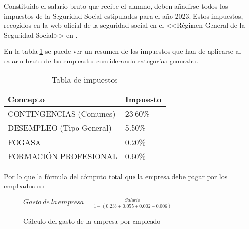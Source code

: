 Constituido el salario bruto que recibe el alumno, deben añadirse todos los
impuestos de la Seguridad Social estipulados para el año 2023. Estos impuestos,
recogidos en la web oficial de la seguridad social en el <<Régimen General de la
Seguridad Social>> en \cite{cotizacion2023}.

En la tabla \ref{tabla:seg-social} se puede ver un resumen de los impuestos que
han de aplicarse al salario bruto de los empleados considerando categorías
generales.

\begin{table}[H]
    \centering
    \begin{tabular}{ll}
        \toprule
    \textbf{Concepto}  & \textbf{Impuesto} \\ \midrule
    CONTINGENCIAS   (Comunes)  & 23.60\% \\
    DESEMPLEO  (Tipo General) & 5.50\%  \\
    FOGASA                   & 0.20\%  \\
    FORMACIÓN PROFESIONAL      & 0.60\% 
    \end{tabular}%
    \caption{Tabla de impuestos}
    \label{tabla:seg-social}
\end{table}

Por lo que la fórmula del cómputo total que la empresa debe pagar por los
empleados es:

\begin{figure}[H]
\begin{center}
    $Gasto~de~la~empresa = \frac{Salario}{1-(0.236+0.055+0.002+0.006)}$
\end{center}
\caption{Cálculo del gasto de la empresa por empleado}
\end{figure}


\begin{table}[H]
\caption{Salarios brutos y coste que supone a la empresa}
\label{tabla:salarios}
\end{table}

